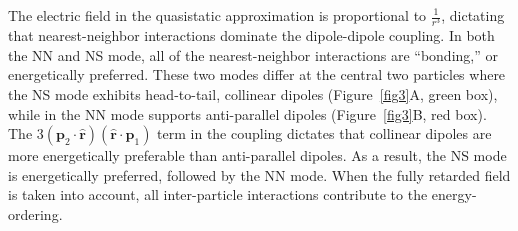 \documentclass[journal=jpccck,manuscript=article]{achemso}
\begin{document}
The electric field in the quasistatic approximation is proportional to $\frac{1}{r^3}$, dictating that nearest-neighbor interactions dominate the dipole-dipole coupling. In both the NN and NS mode, all of the nearest-neighbor interactions are ``bonding,'' or energetically preferred. These two modes differ at the central two particles where the NS mode exhibits head-to-tail, collinear dipoles (Figure~\ref{fig3}A, green box), while in the NN mode supports anti-parallel dipoles (Figure~\ref{fig3}B, red box). The $3(\textbf{p}_2 \cdot \hat{\textbf{r}}) (\hat{\textbf{r}} \cdot \textbf{p}_1)$ term in the coupling dictates that collinear dipoles are more energetically preferable than anti-parallel dipoles. As a result, the NS mode is energetically preferred, followed by the NN mode. When the fully retarded field is taken into account, all inter-particle interactions contribute to the energy-ordering.
\end{document}
